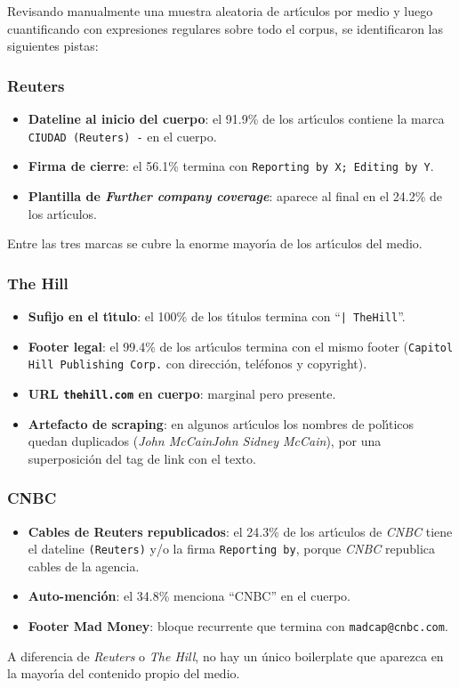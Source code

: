 \documentclass[11pt,a4paper]{article}
\begin{document}
Revisando manualmente una muestra aleatoria de art\'{\i}culos por medio y luego cuantificando con expresiones regulares sobre todo el corpus, se identificaron las siguientes pistas:

\subsubsection*{Reuters}
\begin{itemize}
    \item \textbf{Dateline al inicio del cuerpo}: el 91.9\% de los art\'{\i}culos contiene la marca \texttt{CIUDAD (Reuters) -} en el cuerpo.
    \item \textbf{Firma de cierre}: el 56.1\% termina con \texttt{Reporting by X; Editing by Y}.
    \item \textbf{Plantilla de \textit{Further company coverage}}: aparece al final en el 24.2\% de los art\'{\i}culos.
\end{itemize}
Entre las tres marcas se cubre la enorme mayor\'{\i}a de los art\'{\i}culos del medio.

\subsubsection*{The Hill}
\begin{itemize}
    \item \textbf{Sufijo en el t\'{\i}tulo}: el 100\% de los t\'{\i}tulos termina con ``\texttt{| TheHill}''.
    \item \textbf{Footer legal}: el 99.4\% de los art\'{\i}culos termina con el mismo footer (\texttt{Capitol Hill Publishing Corp.} con direcci\'{o}n, tel\'{e}fonos y copyright).
    \item \textbf{URL \texttt{thehill.com} en cuerpo}: marginal pero presente.
    \item \textbf{Artefacto de scraping}: en algunos art\'{\i}culos los nombres de pol\'{\i}ticos quedan duplicados (\textit{John McCainJohn Sidney McCain}), por una superposici\'{o}n del tag de link con el texto.
\end{itemize}

\subsubsection*{CNBC}
\begin{itemize}
    \item \textbf{Cables de Reuters republicados}: el 24.3\% de los art\'{\i}culos de \textit{CNBC} tiene el dateline \texttt{(Reuters)} y/o la firma \texttt{Reporting by}, porque \textit{CNBC} republica cables de la agencia.
    \item \textbf{Auto-menci\'{o}n}: el 34.8\% menciona ``CNBC'' en el cuerpo.
    \item \textbf{Footer Mad Money}: bloque recurrente que termina con \texttt{madcap@cnbc.com}.
\end{itemize}
A diferencia de \textit{Reuters} o \textit{The Hill}, no hay un \'{u}nico boilerplate que aparezca en la mayor\'{\i}a del contenido propio del medio.
\end{document}

